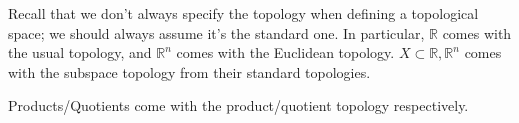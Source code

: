 \begin{remark}
    Recall that we don't always specify the topology when defining a topological space; we should always assume it's the standard one. In particular, $\mathbb{R}$ comes with the usual topology, and $\mathbb{R}^n$ comes with the Euclidean topology. $X\subset \mathbb{R},\mathbb{R}^n$ comes with the subspace topology from their standard topologies.

    Products/Quotients come with the product/quotient topology respectively.
\end{remark}